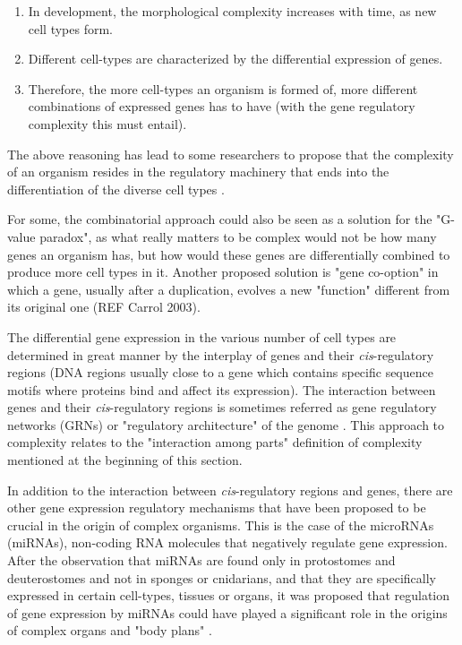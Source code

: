 \begin{enumerate}
\item In development, the morphological complexity increases with time, as new cell types form.
\item Different cell-types are characterized by the differential expression of genes.
\item Therefore, the more cell-types an organism is formed of, more different combinations of expressed genes has to have (with the gene regulatory complexity this must entail).
\end{enumerate}

The above reasoning has lead to some researchers to propose that the complexity of an organism resides in the regulatory machinery that ends into the differentiation of the diverse cell types \citep{Davidson2001}. 

For some, the combinatorial approach could also be seen as a solution for the "G-value paradox", as what really matters to be complex would not be how many genes an organism has, but how would these genes are differentially combined to produce more cell types in it. Another proposed solution is "gene co-option" in which a gene, usually after a duplication, evolves a new "function" different from its original one (REF Carrol 2003).

The differential gene expression in the various number of cell types are determined in great manner by the interplay of genes and their \textit{cis}-regulatory regions (DNA regions usually close to a gene which contains specific sequence motifs where proteins bind and affect its expression). The interaction between genes and their \textit{cis}-regulatory regions is sometimes referred as gene regulatory networks (GRNs) or "regulatory architecture" of the genome \citep{Davidson2001}.
This approach to complexity relates to the "interaction among parts" definition of complexity mentioned at the beginning of this section.

In addition to the interaction between \textit{cis}-regulatory regions and genes, there are other gene expression regulatory mechanisms that have been proposed to be crucial in the origin of complex organisms.
This is the case of the microRNAs (miRNAs),
non-coding RNA molecules that negatively regulate gene expression.
After the observation that miRNAs are found only in protostomes and deuterostomes and not in sponges or cnidarians, and that they are specifically expressed in certain cell-types, tissues or organs, it was proposed that regulation of gene expression by miRNAs could have played a significant role in the origins of complex organs and "body plans" \citep{Sempere2006}.

